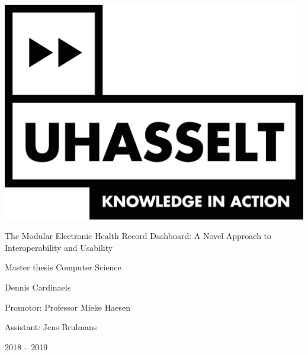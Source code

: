 
\begin{titlepage}
    \centering
    
    
    \includegraphics[scale=0.5]{chapters/title_page/logo_uhasselt}		
    \vspace{1cm}
    
    \Huge The Modular Electronic Health Record Dashboard: A Novel Approach to Interoperability and Usability
    \vspace{0.4cm}
    
    \large Master thesis Computer Science
    \vspace{1cm}
    
    \LARGE Dennis Cardinaels
    \vspace{1cm}
    
    \large Promotor: Professor Mieke Haesen
    \vspace{0.2cm}
    
    Assistant: Jens Brulmans
    
    \vspace{1.2cm}
    
    
    \Large 2018 -- 2019 %
    
\end{titlepage}